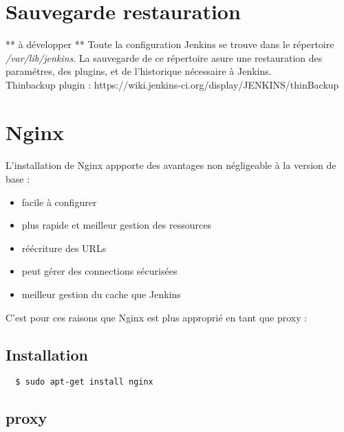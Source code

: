 \documentclass{article}
\begin{document}
\newpage
\section{Sauvegarde restauration}
** à développer **
Toute la configuration Jenkins se trouve dans le répertoire \textit{/var/lib/jenkins}.
La sauvegarde de ce répertoire asure une restauration des paramétres, des plugins, et de l'historique nécessaire à Jenkins.\\
Thinbackup plugin : https://wiki.jenkins-ci.org/display/JENKINS/thinBackup

\section{Nginx}
\paragraph{}L'installation de Nginx appporte des avantages non négligeable à la version de base : 
\begin{itemize}
  \item facile à configurer
  \item plus rapide et meilleur gestion des ressources
  \item réécriture des URLs
  \item peut gérer des connections sécurisées
  \item meilleur gestion du cache que Jenkins
\end{itemize}
C'est pour ces raisons que Nginx est plus approprié en tant que proxy :

\subsection{Installation}
\begin{verbatim}
  $ sudo apt-get install nginx
\end{verbatim}




\subsection{proxy}
\end{document}
